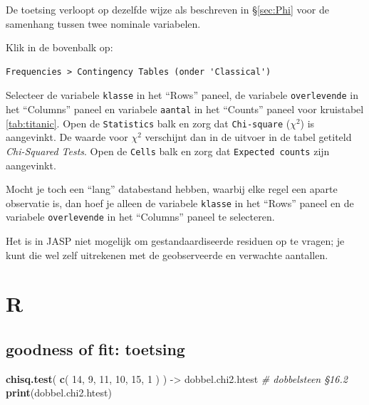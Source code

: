\documentclass[
]{book}
\newenvironment{Shaded}{\begin{snugshade}}{\end{snugshade}}
\newcommand{\CommentTok}[1]{\textcolor[rgb]{0.56,0.35,0.01}{\textit{#1}}}
\newcommand{\DecValTok}[1]{\textcolor[rgb]{0.00,0.00,0.81}{#1}}
\newcommand{\KeywordTok}[1]{\textcolor[rgb]{0.13,0.29,0.53}{\textbf{#1}}}
\newcommand{\NormalTok}[1]{#1}
\newcommand{\StringTok}[1]{\textcolor[rgb]{0.31,0.60,0.02}{#1}}
\begin{document}
De toetsing verloopt op dezelfde wijze als beschreven in
§\ref{sec:Phi} voor de samenhang tussen twee nominale variabelen.

Klik in de bovenbalk op:

\begin{verbatim}
Frequencies > Contingency Tables (onder 'Classical')
\end{verbatim}

Selecteer de variabele \texttt{klasse} in het ``Rows'' paneel, de variabele \texttt{overlevende} in het ``Columns'' paneel en variabele \texttt{aantal} in het ``Counts'' paneel voor kruistabel \ref{tab:titanic}. Open de \texttt{Statistics} balk
en zorg dat \texttt{Chi-square} (\(\chi^2\)) is aangevinkt. De waarde voor \(\chi^2\) verschijnt dan in de uitvoer in de tabel getiteld \emph{Chi-Squared Tests}.
Open de \texttt{Cells} balk en zorg dat \texttt{Expected\ counts} zijn aangevinkt.

Mocht je toch een ``lang'' databestand hebben, waarbij elke regel een aparte observatie is, dan hoef je alleen de variabele \texttt{klasse} in het ``Rows'' paneel en de variabele \texttt{overlevende} in het ``Columns'' paneel te selecteren.

Het is in JASP niet mogelijk om gestandaardiseerde residuen op te vragen; je kunt die wel zelf uitrekenen met de geobserveerde en verwachte aantallen.

\hypertarget{r-17}{%
\section{R}\label{r-17}}

\hypertarget{goodness-of-fit-toetsing-2}{%
\subsection{goodness of fit: toetsing}\label{goodness-of-fit-toetsing-2}}

\begin{Shaded}
\begin{Highlighting}[]
\KeywordTok{chisq.test}\NormalTok{( }\KeywordTok{c}\NormalTok{( }\DecValTok{14}\NormalTok{, }\DecValTok{9}\NormalTok{, }\DecValTok{11}\NormalTok{, }\DecValTok{10}\NormalTok{, }\DecValTok{15}\NormalTok{, }\DecValTok{1}\NormalTok{ ) ) {-}\textgreater{}}\StringTok{ }\NormalTok{dobbel.chi2.htest }\CommentTok{\# dobbelsteen §16.2}
\KeywordTok{print}\NormalTok{(dobbel.chi2.htest)}
\end{Highlighting}
\end{Shaded}
\end{document}
